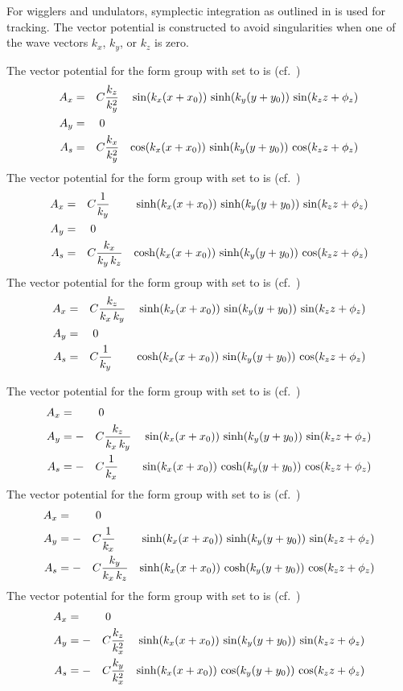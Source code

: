 For  wigglers and undulators, symplectic integration as
outlined in  is used for tracking. The vector
potential is constructed to avoid singularities when one of the wave
vectors $k_x$, $k_y$, or $k_z$ is zero. 

The vector potential for the  form group with  set to
 is (cf.~)
\begin{alignat}{4}
  A_x &=  &C &\dfrac{k_z}{k_y^2}      & \sin(k_x (x + x_0)) \, \sinh(k_y (y + y_0)) \, \sin(k_z z + \phi_z) \nonumber \\
  A_y &=  &0 && \label{bf1} \\
  A_s &=  &C &\dfrac{k_x}{k_y^2}      & \cos(k_x (x + x_0)) \, \sinh(k_y (y + y_0)) \, \cos(k_z z + \phi_z) \nonumber
\end{alignat}
The vector potential for the  form group with  set to
 is (cf.~)
\begin{alignat}{4}
  A_x &=  &C &\dfrac{1}{k_y}          & \sinh(k_x (x + x_0)) \, \sinh(k_y (y + y_0)) \, \sin(k_z z + \phi_z) \nonumber \\
  A_y &=  &0 && \label{bf3} \\
  A_s &=  &C &\dfrac{k_x}{k_y \, k_z} & \cosh(k_x (x + x_0)) \, \sinh(k_y (y + y_0)) \, \cos(k_z z + \phi_z) \nonumber
\end{alignat}
The vector potential for the  form group with  set to
 is (cf.~)
\begin{alignat}{4}
  A_x &=  &C &\dfrac{k_z}{k_x \, k_y} & \sinh(k_x (x + x_0)) \, \sin(k_y (y + y_0)) \, \sin(k_z z + \phi_z) \nonumber \\
  A_y &=  &0 && \label{bf5} \\
  A_s &=  &C &\dfrac{1}{k_y}          & \cosh(k_x (x + x_0)) \, \sin(k_y (y + y_0)) \, \cos(k_z z + \phi_z) \nonumber
\end{alignat}

The vector potential for the  form group with  set to
 is (cf.~)
\begin{alignat}{4}
  A_x &=  &0 &&\nonumber \\
  A_y &= -&C &\dfrac{k_z}{k_x \, k_y} & \sin(k_x (x + x_0)) \, \sinh(k_y (y + y_0)) \, \sin(k_z z + \phi_z) \label{bf2} \\
  A_s &= -&C &\dfrac{1}{k_x}          & \sin(k_x (x + x_0)) \, \cosh(k_y (y + y_0)) \, \cos(k_z z + \phi_z) \nonumber
\end{alignat}
The vector potential for the  form group with  set to
 is (cf.~)
\begin{alignat}{4}
  A_x &=  &0 &&\nonumber \\
  A_y &= -&C &\dfrac{1}{k_x}          & \sinh(k_x (x + x_0)) \, \sinh(k_y (y + y_0)) \, \sin(k_z z + \phi_z) \label{bf4} \\
  A_s &= -&C &\dfrac{k_y}{k_x \, k_z} & \sinh(k_x (x + x_0)) \, \cosh(k_y (y + y_0)) \, \cos(k_z z + \phi_z) \nonumber
\end{alignat}
The vector potential for the  form group with  set to
 is (cf.~)
\begin{alignat}{4}
  A_x &=  &0 &&\nonumber \\
  A_y &= -&C &\dfrac{k_z}{k_x^2}      & \sinh(k_x (x + x_0)) \, \sin(k_y (y + y_0)) \, \sin(k_z z + \phi_z) \label{bf6} \\
  A_s &= -&C &\dfrac{k_y}{k_x^2}      & \sinh(k_x (x + x_0)) \, \cos(k_y (y + y_0)) \, \cos(k_z z + \phi_z) \nonumber
\end{alignat}

